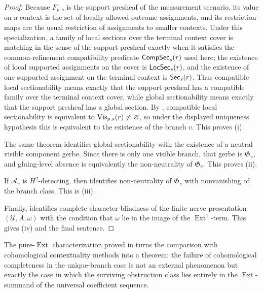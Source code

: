 \begin{proof}
Because $F_{p,s}$ is the support presheaf of the measurement scenario,
its value on a context is the set of locally allowed outcome assignments, and
its restriction maps are the usual restriction of assignments to smaller
contexts. Under this specialization, a family of local sections over the
terminal context cover is matching in the sense of the support presheaf exactly
when it satisfies the common-refinement compatibility predicate
$\mathsf{CompSec}_s(r)$ used here; the existence of local supported assignments on the
cover is $\mathsf{LocSec}_s(r)$, and the existence of one supported assignment on the
terminal context is $\mathsf{Sec}_s(r)$. Thus compatible local sectionability means
exactly that the support presheaf has a compatible family over the terminal
context cover, while global sectionability means exactly that the support
presheaf has a global section. By
, compatible local sectionability is equivalent
to $\mathrm{Vis}_{p,s}(r)\neq\varnothing$, so under the displayed uniqueness hypothesis
this is equivalent to the existence of the branch $v$. This proves
\textup{(i)}.

The same theorem identifies global sectionability with the existence of a
neutral visible component gerbe. Since there is only one visible branch, that
gerbe is $\mathfrak G_v$, and gluing-level absence is equivalently the
non-neutrality of $\mathfrak G_v$. This proves \textup{(ii)}.

If $\mathcal A_v$ is $H^2$-detecting, then
 identifies non-neutrality of
$\mathfrak G_v$ with nonvanishing of the branch class. This is \textup{(iii)}.

Finally,  identifies complete
character-blindness of the finite nerve presentation $(\mathcal U,A,\omega)$
with the condition that $\omega$ lie in the image of the
$\operatorname{Ext}^1$-term. This gives \textup{(iv)} and the final sentence.
\end{proof}

\begin{remark}\label{rem:caru-ext-residual}
The pure-$\operatorname{Ext}$ characterization proved in
 turns the comparison with
cohomological contextuality methods
\cite{AbramskyMansfieldBarbosa2012,AbramskyBarbosaKishidaLalMansfield2015,Caru2017}
into a theorem: the failure of cohomological completeness in the unique-branch
case is not an external phenomenon but exactly the case in which the surviving
obstruction class lies entirely in the $\operatorname{Ext}$-summand of the
universal coefficient sequence.
\end{remark}


